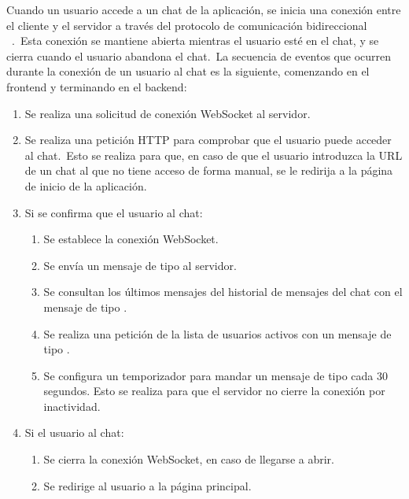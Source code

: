 
Cuando un usuario accede a un chat de la aplicación, se inicia una conexión entre el cliente y el servidor a través
del protocolo de comunicación bidireccional ~\cite{RFCWebSocket}.\ Esta conexión se mantiene
abierta mientras el
usuario esté en el chat, y se cierra cuando el usuario abandona el chat.\ La secuencia de eventos que ocurren durante
la conexión de un usuario al chat es la siguiente, comenzando en el frontend y terminando en el backend:


\begin{enumerate}
	\item Se realiza una solicitud de conexión WebSocket al servidor.
	\item Se realiza una petición HTTP para comprobar que el usuario puede acceder al chat.\ Esto se realiza para
	que, en caso de que el usuario introduzca la URL de un chat al que no tiene acceso de forma manual, se le redirija
	a la página de inicio de la aplicación.
	\item Si se confirma que el usuario  al chat:
	\begin{enumerate}
		\item Se establece la conexión WebSocket.
		\item Se envía un mensaje de tipo  al servidor.
		\item Se consultan los últimos mensajes del historial de mensajes del chat con el mensaje de tipo
		.
		\item Se realiza una petición de la lista de usuarios activos con un mensaje de tipo
		.
		\item Se configura un temporizador para mandar un mensaje de tipo  cada 30 segundos.
		Esto se realiza para que el servidor no cierre la conexión por inactividad.
	\end{enumerate}
	\item Si el usuario  al chat:
	\begin{enumerate}
		\item Se cierra la conexión WebSocket, en caso de llegarse a abrir.
		\item Se redirige al usuario a la página principal.
	\end{enumerate}
\end{enumerate}
\label{itm:frontend-connection-life-cycle}

